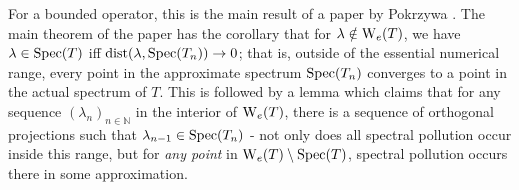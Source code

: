 \documentclass[../main.tex]{subfiles}
\begin{document}
For a bounded operator, this is the main result of a paper by Pokrzywa \parencite{pokrzywa1979method}. The main theorem of the paper has the
corollary that for $\lambda \notin \mathrm{W}_e(T)$, we have $\lambda \in \mathrm{Spec}(T)$ iff $\text{dist}(\lambda, \mathrm{Spec}(T_n)) \rightarrow 0$; that is, outside of the
essential numerical range, every point in the approximate spectrum $\mathrm{Spec}(T_n)$ converges to a point in the actual spectrum of $T$. This is followed by
a lemma which claims that for any sequence $(\lambda_n)_{n \in \mathbb{N}}$ in the interior of $\mathrm{W}_e(T)$, there is a sequence of orthogonal projections such that $\lambda_{n-1} \in \mathrm{Spec}(T_n)$ - not only does all spectral pollution occur inside this range, but for \emph{any point} in 
$\mathrm{W}_e(T) \setminus \mathrm{Spec}(T)$, spectral pollution occurs there in some approximation.
\end{document}
